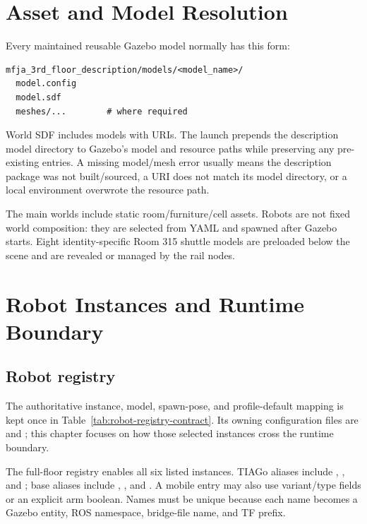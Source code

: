 \section{Asset and Model Resolution}

Every maintained reusable Gazebo model normally has this form:

\begin{lstlisting}
mfja_3rd_floor_description/models/<model_name>/
  model.config
  model.sdf
  meshes/...        # where required
\end{lstlisting}

World SDF includes models with  URIs. The launch prepends the
description model directory to Gazebo's model and resource paths while
preserving any pre-existing entries. A missing model/mesh error usually means
the description package was not built/sourced, a URI does not match its model
directory, or a local environment overwrote the resource path.

The main worlds include static room/furniture/cell assets. Robots are not fixed
world composition: they are selected from YAML and spawned after Gazebo starts.
Eight identity-specific Room 315 shuttle models are preloaded below the scene
and are revealed or managed by the rail nodes.

\section{Robot Instances and Runtime Boundary}

\subsection{Robot registry}

The authoritative instance, model, spawn-pose, and profile-default mapping is
kept once in Table~\ref{tab:robot-registry-contract}. Its owning configuration
files are  and
; this chapter
focuses on how those selected instances cross the runtime boundary.

The full-floor registry enables all six listed instances. TIAGo aliases include
, , and ; base aliases include
, , and . A mobile
entry may also use variant/type fields or an explicit arm boolean. Names must be
unique because each name becomes a Gazebo entity, ROS namespace, bridge-file
name, and TF prefix.


